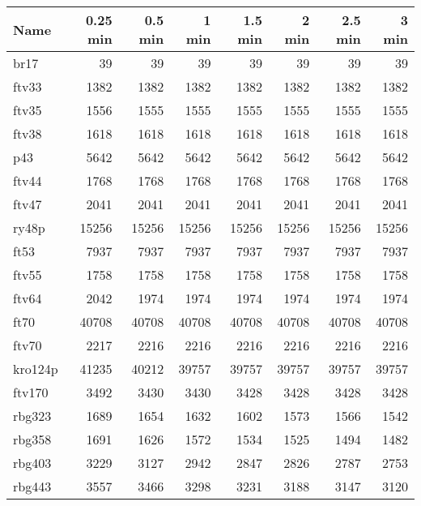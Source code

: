 \begin{table}
\centering
\begin{tabular}{l|r|r|r|r|r|r|r}
\hline
Name & 0.25 min & 0.5 min & 1 min & 1.5 min & 2 min & 2.5 min & 3 min\\
\hline
br17 & 39 & 39 & 39 & 39 & 39 & 39 & 39\\
\hline
ftv33 & 1382 & 1382 & 1382 & 1382 & 1382 & 1382 & 1382\\
\hline
ftv35 & 1556 & 1555 & 1555 & 1555 & 1555 & 1555 & 1555\\
\hline
ftv38 & 1618 & 1618 & 1618 & 1618 & 1618 & 1618 & 1618\\
\hline
p43 & 5642 & 5642 & 5642 & 5642 & 5642 & 5642 & 5642\\
\hline
ftv44 & 1768 & 1768 & 1768 & 1768 & 1768 & 1768 & 1768\\
\hline
ftv47 & 2041 & 2041 & 2041 & 2041 & 2041 & 2041 & 2041\\
\hline
ry48p & 15256 & 15256 & 15256 & 15256 & 15256 & 15256 & 15256\\
\hline
ft53 & 7937 & 7937 & 7937 & 7937 & 7937 & 7937 & 7937\\
\hline
ftv55 & 1758 & 1758 & 1758 & 1758 & 1758 & 1758 & 1758\\
\hline
ftv64 & 2042 & 1974 & 1974 & 1974 & 1974 & 1974 & 1974\\
\hline
ft70 & 40708 & 40708 & 40708 & 40708 & 40708 & 40708 & 40708\\
\hline
ftv70 & 2217 & 2216 & 2216 & 2216 & 2216 & 2216 & 2216\\
\hline
kro124p & 41235 & 40212 & 39757 & 39757 & 39757 & 39757 & 39757\\
\hline
ftv170 & 3492 & 3430 & 3430 & 3428 & 3428 & 3428 & 3428\\
\hline
rbg323 & 1689 & 1654 & 1632 & 1602 & 1573 & 1566 & 1542\\
\hline
rbg358 & 1691 & 1626 & 1572 & 1534 & 1525 & 1494 & 1482\\
\hline
rbg403 & 3229 & 3127 & 2942 & 2847 & 2826 & 2787 & 2753\\
\hline
rbg443 & 3557 & 3466 & 3298 & 3231 & 3188 & 3147 & 3120\\
\hline
\end{tabular}
\end{table}

